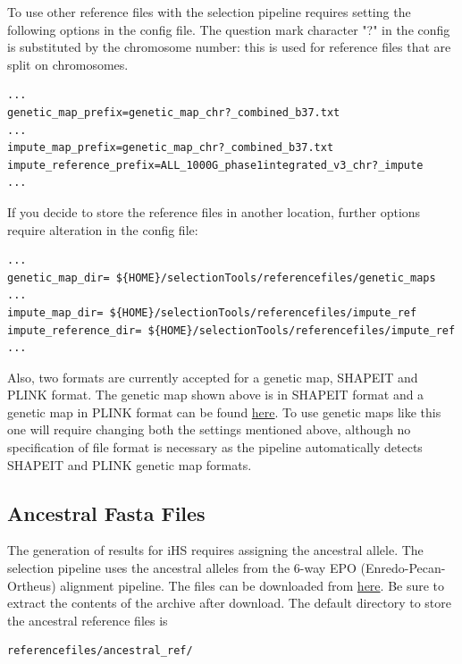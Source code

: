 \documentclass[a4paper,10pt]{article}
\begin{document}
To use other reference files with the selection pipeline requires
setting the following options in the config file. The question mark character
"?" in the config is substituted by the chromosome number: this is
used for reference files that are split on chromosomes.\\

\begin{verbatim}
...
genetic_map_prefix=genetic_map_chr?_combined_b37.txt
...
impute_map_prefix=genetic_map_chr?_combined_b37.txt
impute_reference_prefix=ALL_1000G_phase1integrated_v3_chr?_impute
...
\end{verbatim}

\noindent
If you decide to store the reference files in another location,
further options require alteration in the config file:\\ 
\begin{verbatim}
...
genetic_map_dir= ${HOME}/selectionTools/referencefiles/genetic_maps
...
impute_map_dir= ${HOME}/selectionTools/referencefiles/impute_ref
impute_reference_dir= ${HOME}/selectionTools/referencefiles/impute_ref
...
\end{verbatim}

\noindent
Also, two formats are currently accepted for a genetic map, SHAPEIT and PLINK format.
The genetic map shown above is in SHAPEIT format and a genetic map in PLINK format can be found
\href{http://bochet.gcc.biostat.washington.edu/beagle/genetic_maps/plink.GRCh37.map.zip}{here}.
To use genetic maps like this one will require changing both the settings mentioned above, although
no specification of file format is necessary as the pipeline automatically detects SHAPEIT and PLINK
genetic map formats.

\subsection{Ancestral Fasta Files}
The generation of results for iHS requires assigning the ancestral
allele. The selection pipeline uses the ancestral alleles from the
6-way EPO (Enredo-Pecan-Ortheus) alignment pipeline. The files can be
downloaded from
\href{ftp://ftp.1000genomes.ebi.ac.uk/vol1/ftp/phase1/analysis_results/supporting/ancestral_alignments/human_ancestor_GRCh37_e59.tar.bz2}{here}. Be
sure to extract the contents of the archive after download. The default
directory to store the ancestral reference files is\\
\begin{verbatim}
referencefiles/ancestral_ref/
\end{verbatim}
\end{document}
